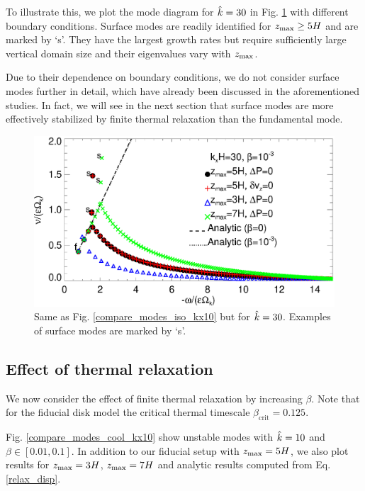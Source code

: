 To illustrate this, we plot the mode diagram for $\hat{k}=30$ in  
Fig. \ref{compare_modes_iso_kx30} with different boundary 
conditions. Surface modes are readily identified for 
$z_\mathrm{max}\geq 5H$ and are marked by `s'. They have the largest growth
rates but require sufficiently large vertical domain size and their
eigenvalues vary with $z_\mathrm{max}$.   

Due to their dependence on boundary conditions, we do not consider
surface modes further in detail, which have
already been discussed in the aforementioned studies. In fact, we will
see in the next section that surface modes are more effectively
stabilized by finite thermal relaxation than the fundamental mode. 

\begin{figure}
  \includegraphics[width=\linewidth]{figures/compare_modes_iso_kx30_analytic.ps}
  \caption{Same as Fig. \ref{compare_modes_iso_kx10} but for $\hat{k}=30$. Examples of surface modes are
    marked by `s'. \label{compare_modes_iso_kx30}
  }
\end{figure}


\subsection{Effect of thermal relaxation}\label{therm_relax_eff}
We now consider the effect of finite thermal relaxation by increasing 
$\beta$. Note that for the fiducial disk model the critical thermal 
timescale $\beta_\mathrm{crit} = 0.125$.  

Fig. \ref{compare_modes_cool_kx10} show unstable modes with $\hat{k}=10$ 
and $\beta\in[0.01,0.1]$. In addition to our fiducial setup with 
$z_\mathrm{max}=5H$, we also plot results for $z_\mathrm{max}=3H$, $z_\mathrm{max}=7H$ and 
analytic results computed from Eq. \ref{relax_disp}.  %

